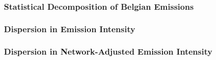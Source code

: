 \subsubsection{Statistical Decomposition of Belgian Emissions}

%
%

\subsubsection{Dispersion in Emission Intensity}

%
%
%
%

\subsubsection{Dispersion in Network-Adjusted Emission Intensity}

%
%
